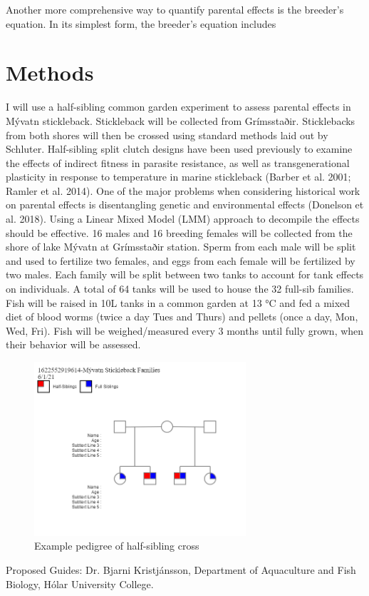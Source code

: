 \documentclass[12pt]{extarticle}
\begin{document}
Another more comprehensive way to quantify parental effects is the breeder's equation. In its simplest form, the breeder's equation includes  \\






\section*{Methods}

I will use a half-sibling common garden experiment to assess parental effects in Mývatn stickleback. Stickleback will be collected from Grímsstaðir. Sticklebacks from both shores will then be crossed using standard methods laid out by Schluter. Half-sibling split clutch designs have been used previously to examine the effects of indirect fitness in parasite resistance, as well as transgenerational plasticity in response to temperature in marine stickleback (Barber et al. 2001; Ramler et al. 2014). One of the major problems when considering historical work on parental effects is disentangling genetic and environmental effects (Donelson et al. 2018). Using a Linear Mixed Model (LMM) approach to decompile the effects should be effective. 16 males and 16 breeding females will be collected from the shore of lake M\'yvatn at Grímsstaðir station. Sperm from each male will be split and used to fertilize two females, and eggs from each female will be fertilized by two males. Each family will be split between two tanks to account for tank effects on individuals. A total of 64 tanks will be used to house the 32 full-sib families. Fish will be raised in 10L tanks in a common garden at 13 °C and fed a mixed diet of blood worms (twice a day Tues and Thurs) and pellets (once a day, Mon, Wed, Fri). Fish will be weighed/measured every 3 months until fully grown, when their behavior will be assessed.

\begin{figure}
\centering
 \includegraphics[width=0.7\textwidth]{pedigree}
 \caption{Example pedigree of half-sibling cross}
  \label{fig:pedigree1}
\end{figure}


Proposed Guides: Dr. Bjarni Kristj\'ansson, Department of Aquaculture and Fish Biology, H\'olar University College.

\end{document}
